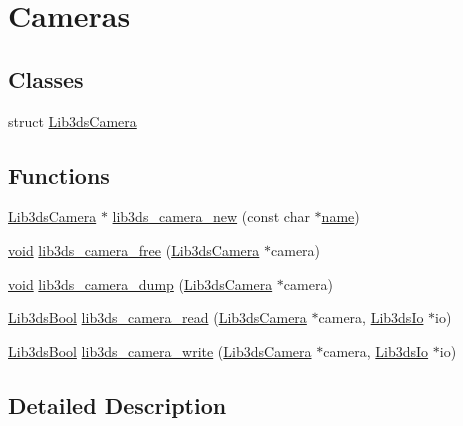 \hypertarget{group__camera}{\section{Cameras}
\label{group__camera}
}
\subsection*{Classes}
\begin{DoxyCompactItemize}
\item 
struct \hyperlink{struct_lib3ds_camera}{Lib3ds\-Camera}
\end{DoxyCompactItemize}
\subsection*{Functions}
\begin{DoxyCompactItemize}
\item 
\hyperlink{struct_lib3ds_camera}{Lib3ds\-Camera} $\ast$ \hyperlink{group__camera_ga2d1b0bd1311c3c9517db6b5e19f62ab9}{lib3ds\-\_\-camera\-\_\-new} (const char $\ast$\hyperlink{glext_8h_ad977737dfc9a274a62741b9500c49a32}{name})
\item 
\hyperlink{group___u_a_v_objects_plugin_ga444cf2ff3f0ecbe028adce838d373f5c}{void} \hyperlink{group__camera_gae87cf28977d2001353078c8a0ca5d1aa}{lib3ds\-\_\-camera\-\_\-free} (\hyperlink{struct_lib3ds_camera}{Lib3ds\-Camera} $\ast$camera)
\item 
\hyperlink{group___u_a_v_objects_plugin_ga444cf2ff3f0ecbe028adce838d373f5c}{void} \hyperlink{group__camera_gad43f1f9266d4e0b258525d9efa555f97}{lib3ds\-\_\-camera\-\_\-dump} (\hyperlink{struct_lib3ds_camera}{Lib3ds\-Camera} $\ast$camera)
\item 
\hyperlink{types_8h_a89dd7398a9ebbbf28011f8c32df67ad3}{Lib3ds\-Bool} \hyperlink{group__camera_ga1058381be904ceeca8b36426e6bfa8fa}{lib3ds\-\_\-camera\-\_\-read} (\hyperlink{struct_lib3ds_camera}{Lib3ds\-Camera} $\ast$camera, \hyperlink{struct_lib3ds_io}{Lib3ds\-Io} $\ast$io)
\item 
\hyperlink{types_8h_a89dd7398a9ebbbf28011f8c32df67ad3}{Lib3ds\-Bool} \hyperlink{group__camera_gaa122bbd6f2709e33401cd54994b60373}{lib3ds\-\_\-camera\-\_\-write} (\hyperlink{struct_lib3ds_camera}{Lib3ds\-Camera} $\ast$camera, \hyperlink{struct_lib3ds_io}{Lib3ds\-Io} $\ast$io)
\end{DoxyCompactItemize}


\subsection{Detailed Description}


